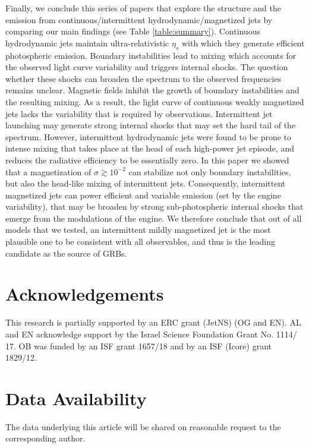 \documentclass[fleqn,usenatbib]{mnras}
\begin{document}
    Finally, we conclude this series of papers that explore the structure and the emission from continuous/intermittent hydrodynamic/magnetized jets by comparing our main findings (see Table \ref{table:summary}).
    Continuous hydrodynamic jets maintain ultra-relativistic $ \eta_s $ with which they generate efficient photospheric emission. Boundary instabilities lead to mixing which accounts for the observed light curve variability and triggers internal shocks. The question whether these shocks can broaden the spectrum to the observed frequencies remains unclear.
    Magnetic fields inhibit the growth of boundary instabilities and the resulting mixing. As a result, the light curve of continuous weakly magnetized jets lacks the variability that is required by observations.
    Intermittent jet launching may generate strong internal shocks that may set the hard tail of the spectrum. However, intermittent hydrodynamic jets were found to be prone to intense mixing that takes place at the head of each high-power jet episode, and reduces the radiative efficiency to be essentially zero. In this paper we showed that a magnetization of $ \sigma \gtrsim 10^{-2} $ can stabilize not only boundary instabilities, but also the head-like mixing of intermittent jets. Consequently, intermittent magnetized jets can power efficient and variable emission (set by the engine variability), that may be broaden by strong sub-photospheric internal shocks that emerge from the modulations of the engine. We therefore conclude that out of all models that we tested, an intermittent mildly magnetized jet is the most plausible one to be consistent with all observables, and thus is the leading candidate as the source of GRBs.
    
	\section*{Acknowledgements}
	
	This research is partially supported by an ERC grant (JetNS) (OG and EN).
	AL and EN acknowledge support by the Israel Science Foundation Grant No. 1114/ 17. OB was funded by an ISF grant 1657/18 and by an ISF (Icore) grant 1829/12.
	
	\section*{Data Availability}
	
	The data underlying this article will be shared on reasonable request to the corresponding author.	
	
\end{document}
